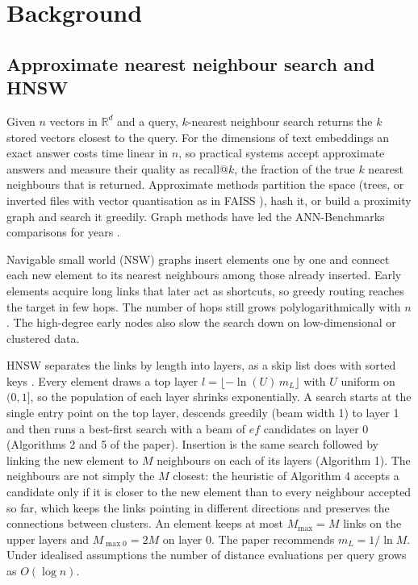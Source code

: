 \documentclass[11pt,a4paper]{article}
\begin{document}
\section{Background}

\subsection{Approximate nearest neighbour search and HNSW}

Given $n$ vectors in $\mathbb{R}^d$ and a query, $k$-nearest neighbour search returns the $k$ stored vectors closest to the query. For the dimensions of text embeddings an exact answer costs time linear in $n$, so practical systems accept approximate answers and measure their quality as recall@$k$, the fraction of the true $k$ nearest neighbours that is returned. Approximate methods partition the space (trees, or inverted files with vector quantisation as in FAISS \citep{johnson2019faiss}), hash it, or build a proximity graph and search it greedily. Graph methods have led the ANN-Benchmarks comparisons for years \citep{aumuller2020annbench}.

Navigable small world (NSW) graphs \citep{malkov2014nsw} insert elements one by one and connect each new element to its nearest neighbours among those already inserted. Early elements acquire long links that later act as shortcuts, so greedy routing reaches the target in few hops. The number of hops still grows polylogarithmically with $n$. The high-degree early nodes also slow the search down on low-dimensional or clustered data.

HNSW separates the links by length into layers, as a skip list does with sorted keys \citep{pugh1990skip}. Every element draws a top layer $l=\lfloor -\ln(U)\,m_L\rfloor$ with $U$ uniform on $(0,1]$, so the population of each layer shrinks exponentially. A search starts at the single entry point on the top layer, descends greedily (beam width 1) to layer 1 and then runs a best-first search with a beam of $ef$ candidates on layer 0 (Algorithms 2 and 5 of the paper). Insertion is the same search followed by linking the new element to $M$ neighbours on each of its layers (Algorithm 1). The neighbours are not simply the $M$ closest: the heuristic of Algorithm 4 accepts a candidate only if it is closer to the new element than to every neighbour accepted so far, which keeps the links pointing in different directions and preserves the connections between clusters. An element keeps at most $M_{\max}=M$ links on the upper layers and $M_{\max0}=2M$ on layer 0. The paper recommends $m_L=1/\ln M$. Under idealised assumptions the number of distance evaluations per query grows as $O(\log n)$.
\end{document}
